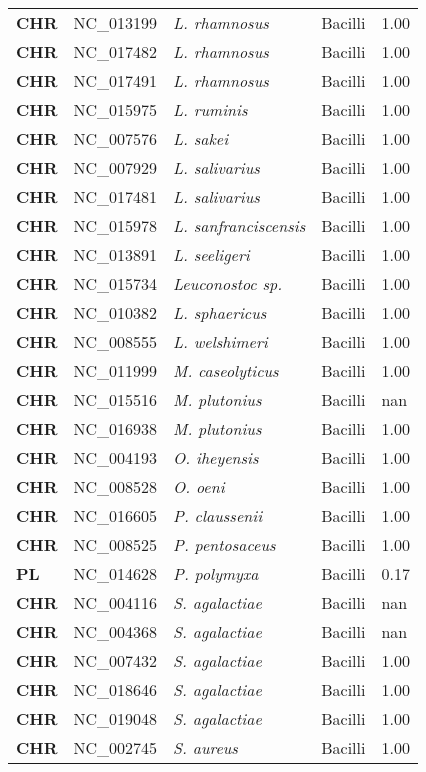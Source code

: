 \begin{adjustwidth}{-3cm}{2cm}
{\begin{supertabular}{>{\bfseries}l|p{0.1\textwidth}p{0.14\textwidth}l|l}
CHR & NC\_013199 & \textit{L. rhamnosus} & Bacilli & 1.00\\
CHR & NC\_017482 & \textit{L. rhamnosus} & Bacilli & 1.00\\
CHR & NC\_017491 & \textit{L. rhamnosus} & Bacilli & 1.00\\
CHR & NC\_015975 & \textit{L. ruminis} & Bacilli & 1.00\\
CHR & NC\_007576 & \textit{L. sakei} & Bacilli & 1.00\\
CHR & NC\_007929 & \textit{L. salivarius} & Bacilli & 1.00\\
CHR & NC\_017481 & \textit{L. salivarius} & Bacilli & 1.00\\
CHR & NC\_015978 & \textit{L. sanfranciscensis} & Bacilli & 1.00\\
CHR & NC\_013891 & \textit{L. seeligeri} & Bacilli & 1.00\\
CHR & NC\_015734 & \textit{Leuconostoc sp.} & Bacilli & 1.00\\
CHR & NC\_010382 & \textit{L. sphaericus} & Bacilli & 1.00\\
CHR & NC\_008555 & \textit{L. welshimeri} & Bacilli & 1.00\\
CHR & NC\_011999 & \textit{M. caseolyticus} & Bacilli & 1.00\\
CHR & NC\_015516 & \textit{M. plutonius} & Bacilli & nan\\
CHR & NC\_016938 & \textit{M. plutonius} & Bacilli & 1.00\\
CHR & NC\_004193 & \textit{O. iheyensis} & Bacilli & 1.00\\
CHR & NC\_008528 & \textit{O. oeni} & Bacilli & 1.00\\
CHR & NC\_016605 & \textit{P. claussenii} & Bacilli & 1.00\\
CHR & NC\_008525 & \textit{P. pentosaceus} & Bacilli & 1.00\\
PL & NC\_014628 & \textit{P. polymyxa} & Bacilli & 0.17\\
CHR & NC\_004116 & \textit{S. agalactiae} & Bacilli & nan\\
CHR & NC\_004368 & \textit{S. agalactiae} & Bacilli & nan\\
CHR & NC\_007432 & \textit{S. agalactiae} & Bacilli & 1.00\\
CHR & NC\_018646 & \textit{S. agalactiae} & Bacilli & 1.00\\
CHR & NC\_019048 & \textit{S. agalactiae} & Bacilli & 1.00\\
CHR & NC\_002745 & \textit{S. aureus} & Bacilli & 1.00\\

\end{supertabular}}
\end{adjustwidth}
